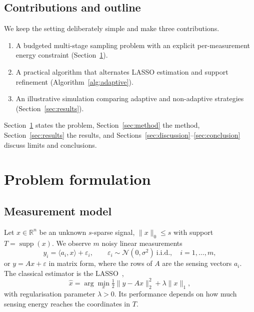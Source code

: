 \documentclass[11pt,a4paper]{article}
\theoremstyle{definition}
\DeclareMathOperator{\supp}{supp}
\newcommand{\R}{\mathbb{R}}
\newcommand{\norm}[1]{\lVert #1\rVert}
\begin{document}
\subsection{Contributions and outline}\label{sec:contrib}
We keep the setting deliberately simple and make three contributions.
\begin{enumerate}
  \item A budgeted multi-stage sampling problem with an explicit per-measurement energy constraint (Section~\ref{sec:problem}).
  \item A practical algorithm that alternates LASSO estimation and support refinement (Algorithm~\ref{alg:adaptive}).
  \item An illustrative simulation comparing adaptive and non-adaptive strategies (Section~\ref{sec:results}).
\end{enumerate}
Section~\ref{sec:problem} states the problem, Section~\ref{sec:method} the method, Section~\ref{sec:results} the results,
and Sections~\ref{sec:discussion}--\ref{sec:conclusion} discuss limits and conclusions.

\section{Problem formulation}\label{sec:problem}

\subsection{Measurement model}
Let $x\in\R^n$ be an unknown $s$-sparse signal, $\norm{x}_0\le s$ with support $T=\supp(x)$. We observe $m$ noisy linear measurements
\begin{equation}\label{eq:model}
  y_i = \langle a_i, x\rangle + \varepsilon_i,\qquad \varepsilon_i\sim\mathcal N(0,\sigma^2)\ \text{i.i.d.},\quad i=1,\dots,m,
\end{equation}
or $y = Ax + \varepsilon$ in matrix form, where the rows of $A$ are the sensing vectors $a_i$. The classical estimator is the LASSO~\cite{tibshirani1996},
\begin{equation}\label{eq:lasso}
  \hat{x} = \arg\min_x \tfrac{1}{2}\lVert y - Ax \rVert_2^2 + \lambda \lVert x \rVert_1 ,
\end{equation}
with regularisation parameter $\lambda>0$. Its performance depends on how much sensing energy reaches the coordinates in $T$.
\end{document}
